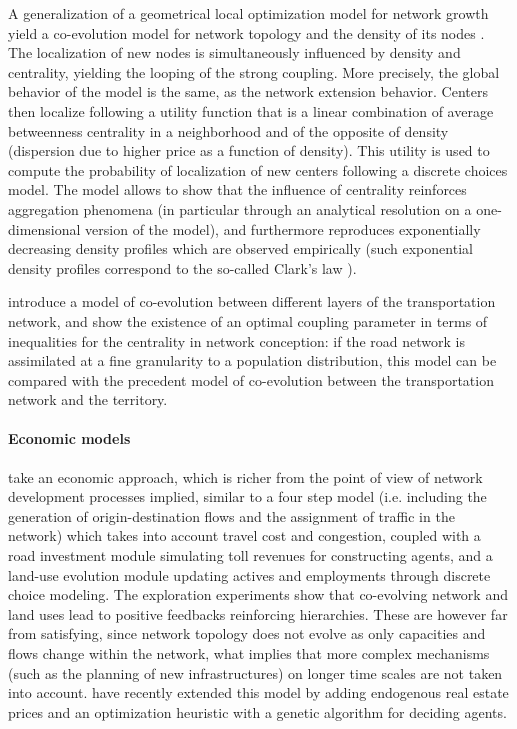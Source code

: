 \documentclass[11pt]{article}
\begin{document}
A generalization of a geometrical local optimization model for network growth yield a co-evolution model for network topology and the density of its nodes \citep{barthelemy2009co}. The localization of new nodes is simultaneously influenced by density and centrality, yielding the looping of the strong coupling. More precisely, the global behavior of the model is the same, as the network extension behavior. Centers then localize following a utility function that is a linear combination of average betweenness centrality in a neighborhood and of the opposite of density (dispersion due to higher price as a function of density). This utility is used to compute the probability of localization of new centers following a discrete choices model. The model allows to show that the influence of centrality reinforces aggregation phenomena (in particular through an analytical resolution on a one-dimensional version of the model), and furthermore reproduces exponentially decreasing density profiles which are observed empirically (such exponential density profiles correspond to the so-called Clark's law \citep{chen2010new}).


\cite{ding2017heuristic} introduce a model of co-evolution between different layers of the transportation network, and show the existence of an optimal coupling parameter in terms of inequalities for the centrality in network conception: if the road network is assimilated at a fine granularity to a population distribution, this model can be compared with the precedent model of co-evolution between the transportation network and the territory.




\paragraph{Economic models}



\cite{levinson2007co} take an economic approach, which is richer from the point of view of network development processes implied, similar to a four step model (i.e. including the generation of origin-destination flows and the assignment of traffic in the network) which takes into account travel cost and congestion, coupled with a road investment module simulating toll revenues for constructing agents, and a land-use evolution module updating actives and employments through discrete choice modeling. The exploration experiments show that co-evolving network and land uses lead to positive feedbacks reinforcing hierarchies. These are however far from satisfying, since network topology does not evolve as only capacities and flows change within the network, what implies that more complex mechanisms (such as the planning of new infrastructures) on longer time scales are not taken into account. \cite{li2016integrated} have recently extended this model by adding endogenous real estate prices and an optimization heuristic with a genetic algorithm for deciding agents.
\end{document}
